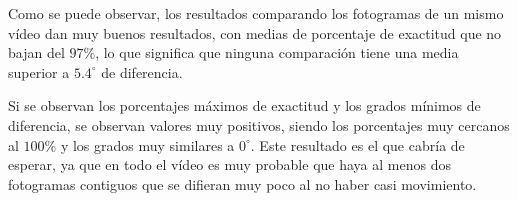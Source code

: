 {\begin{table}[h]
	\centering
\caption{Tabla con los tiempos de la ejecución.}
\label{tab:tiempos}
\end{table}

Como se puede observar, los resultados comparando los fotogramas de un mismo vídeo dan muy buenos resultados, con medias de porcentaje de exactitud que no bajan del $97\%$, lo que significa que ninguna comparación tiene una media superior a $5.4^{\circ}$ de diferencia.

Si se observan los porcentajes máximos de exactitud y los grados mínimos de diferencia, se observan valores muy positivos, siendo los porcentajes muy cercanos al $100\%$ y los grados muy similares a $0^{\circ}$. Este resultado es el que cabría de esperar, ya que en todo el vídeo es muy probable que haya al menos dos fotogramas contiguos que se difieran muy poco al no haber casi movimiento.

}
